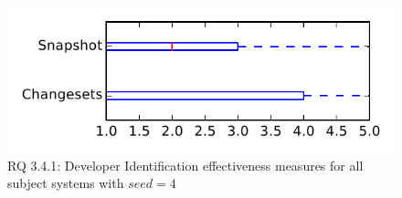 
\begin{figure}
\centering
\includegraphics[height=0.4\textheight]{figures/dit_seed/rq1_tiny_4}
\caption{RQ 3.4.1: Developer Identification effectiveness measures for all subject systems with $seed=4$}
\label{fig:dit_seed:rq1:tiny}
\end{figure}
